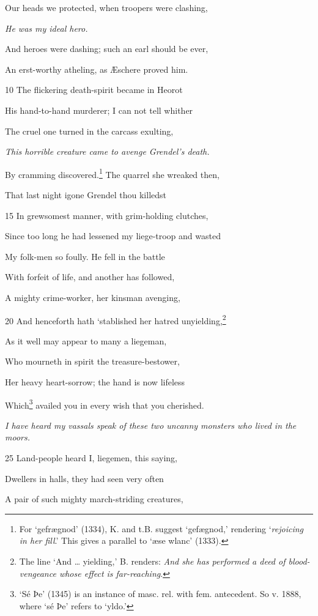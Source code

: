 Our heads we protected, when troopers were clashing,

\emph{He was my ideal
hero.}

And heroes were dashing; such an earl should be ever,

An erst-worthy atheling, as Æschere proved him.

10
The flickering death-spirit became in Heorot

His hand-to-hand murderer; I can not tell whither

The cruel one turned in the carcass exulting,

\emph{This horrible
creature came to
avenge Grendel’s
death.}

By cramming discovered.\footnote{For ‘gefrægnod’ (1334), K. and t.B. suggest ‘gefægnod,’ rendering
‘\emph{rejoicing in her fill}.’ This gives a parallel to ‘æse wlanc’ (1333).} The quarrel she wreaked then,

That last night igone Grendel thou killedst

15
In grewsomest manner, with grim-holding clutches,

Since too long he had lessened my liege-troop and wasted

My folk-men so foully. He fell in the battle

With forfeit of life, and another has followed,

A mighty crime-worker, her kinsman avenging,

20
And henceforth hath ‘stablished her hatred unyielding,\footnote{The line ‘And … yielding,’ B. renders: \emph{And she has performed a deed
of blood-vengeance whose effect is far-reaching}.}

As it well may appear to many a liegeman,

Who mourneth in spirit the treasure-bestower,

Her heavy heart-sorrow; the hand is now lifeless

Which\footnote{‘Sé Þe’ (1345) is an instance of masc. rel. with fem. antecedent. So
v. 1888, where ‘sé Þe’ refers to ‘yldo.’} availed you in every wish that you cherished.

\emph{I have heard my
vassals speak of
these two uncanny
monsters who lived
in the moors.}

25
Land-people heard I, liegemen, this saying,

Dwellers in halls, they had seen very often

A pair of such mighty march-striding creatures,

